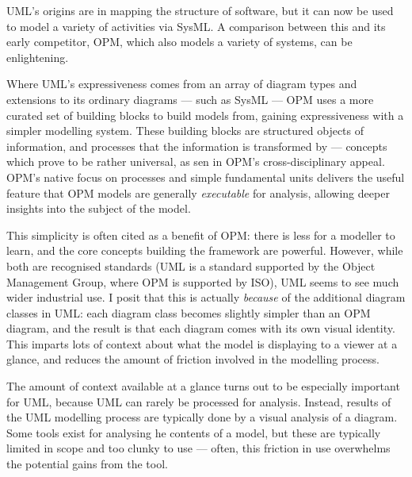 \documentclass[draft]{report}
\begin{document}

UML's origins are in mapping the structure of software, but it can now be used
to model a variety of activities via SysML\cite{sysml_citations}. A comparison
between this and its early competitor, OPM\cite{opm_citations}, which also
models a variety of systems, can be enlightening.\par

Where UML's expressiveness comes from an array of diagram types and extensions
to its ordinary diagrams --- such as SysML --- OPM uses a more curated set of
building blocks to build models from, gaining expressiveness with a simpler
modelling system. These building blocks are structured objects of information,
and processes that the information is transformed by --- concepts which prove to
be rather universal, as sen in OPM's cross-disciplinary
appeal\cite{opm_rna_research}. OPM's native focus on processes and simple
fundamental units delivers the useful feature that OPM models are generally
\emph{executable} for analysis, allowing deeper insights into the subject of
the model.\par

This simplicity is often cited as a benefit of
OPM: there is less for a modeller to learn, and the core concepts building the
framework are powerful. However, while both are recognised standards (UML is a
standard supported by the Object Management Group, where OPM is supported by
ISO), UML seems to see much wider industrial use. I posit that this is actually
\emph{because} of the additional diagram classes in UML: each diagram class
becomes slightly simpler than an OPM diagram, and the result is that each
diagram comes with its own visual identity. This imparts lots of context about
what the model is displaying to a viewer at a glance, and reduces the amount of
friction involved in the modelling process.\par

The amount of context available at a glance turns out to be especially important
for UML, because UML can rarely be processed for analysis. Instead, results of
the UML modelling process are typically done by a visual analysis of a diagram.
Some tools exist for analysing he contents of a model\cite{eclipse_papyrus},
but these are typically limited in scope and too clunky to use --- often, this
friction in use overwhelms the potential gains from the tool.\par
\end{document}
